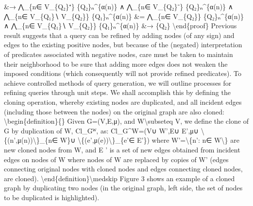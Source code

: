 \documentclass{article}%
\begin{document}
\newline%
\&→ ⋀\_\{n∈ V\_\{Q₂\}⁺\} \{Q₂\}ₙ\^{}\{α(n)\} ∧ ⋀\_\{n∈ V\_\{Q₂\}⁻\} \{Q₂\}ₙ\^{}\{α(n)\} ∧ ⋀\_\{n∈ V\_\{Q₁\}∖ V\_\{Q₂\}\} \{Q₁\}ₙ\^{}\{α(n)\}\newline%
\newline%
\&= ⋀\_\{n∈ V\_\{Q₂\}\} \{Q₂\}ₙ\^{}\{α(n)\} ∧ ⋀\_\{n∈ V\_\{Q₁\}∖ V\_\{Q₂\}\} \{Q₁\}ₙ\^{}\{α(n)\}\newline%
\newline%
\&→ \{Q₂\}\newline%
\newline%
\textbackslash{}end\{proof\}\newline%
Previous result suggests that a query can be refined by adding nodes (of any sign) and edges to the existing positive nodes, but because of the (negated) interpretation of predicates associated with negative nodes, care must be taken to maintain their neighborhood to be sure that adding more edges does not weaken the imposed conditions (which consequently will not provide refined predicates).\newline%
\newline%
To achieve controlled methods of query generation, we will outline processes for refining queries through unit steps. We shall accomplish this by defining the cloning operation, whereby existing nodes are duplicated, and all incident edges (including those between the nodes) on the original graph are also cloned:\newline%
\newline%
\textbackslash{}begin\{definition\}\{\}\newline%
Given G=(V,E,μ), and W\textbackslash{}subseteq V, we define the clone of G by duplication of W, Cl\_Gᵂ, as:\newline%
\newline%
Cl\_G\^{}W=(V∪ W',E∪ E',μ∪ \textbackslash{}\{(n',μ(n))\textbackslash{}\}\_\{n∈ W\}∪ \textbackslash{}\{(e',μ(e))\textbackslash{}\}\_\{e'∈ E'\})\newline%
where W'=\textbackslash{}\{n': n∈ W\textbackslash{}\} are new cloned nodes from W, and E ' is a set of new edges obtained from incident edges on nodes of W where nodes of W are replaced by copies of W' (edges connecting original nodes with cloned nodes and edges connecting cloned nodes, are cloned).\newline%
\textbackslash{}end\{definition\}\textbackslash{}medskip\newline%
\newline%
Figure 3 shows an example of a cloned graph by duplicating two nodes (in the original graph, left side, the set of nodes to be duplicated is highlighted).\newline%
\end{document}
